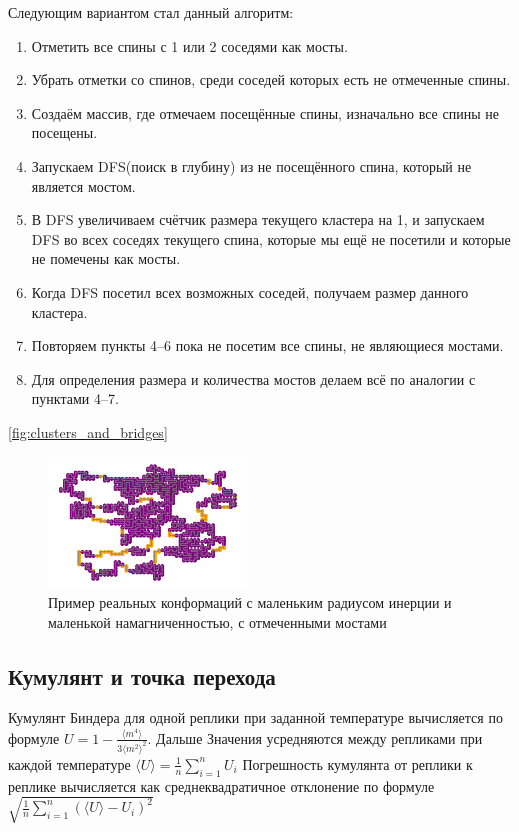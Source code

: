 Следующим вариантом стал данный алгоритм:

\begin{enumerate}
	\item Отметить все спины с 1 или 2 соседями как мосты.
	\item Убрать отметки со спинов, среди соседей которых есть не отмеченные спины.
	\item Создаём массив, где отмечаем посещённые спины, изначально все спины не посещены.
	\item Запускаем DFS(поиск в глубину) из не посещённого спина, который не является мостом.
	\item В DFS увеличиваем счётчик размера текущего кластера на 1, и запускаем DFS во всех соседях текущего спина, которые мы ещё не посетили и которые не помечены как мосты.
	\item Когда DFS посетил всех возможных соседей, получаем размер данного кластера.
	\item Повторяем пункты 4--6 пока не посетим все спины, не являющиеся мостами.
	\item Для определения размера и количества мостов делаем всё по аналогии с пунктами 4--7.
\end{enumerate}

\ref{fig:clusters_and_bridges}

\begin{figure}[h]
	\centering
	\includegraphics[width=0.47\textwidth]{../images/bridges_example_1.png}  
	\caption{Пример реальных конформаций с маленьким радиусом инерции и маленькой намагниченностью, с отмеченными мостами}
	\label{fig:claters_and_bridges}
\end{figure}




\subsection{Кумулянт и точка перехода}

Кумулянт Биндера для одной реплики при заданной температуре вычисляется по формуле $U = 1 - \frac{\langle m^4\rangle}{3\langle m^2\rangle ^2}$. Дальше Значения усредняются между репликами при каждой температуре $\langle U\rangle = \frac{1}{n}\sum_{i=1}^{n}U_i$ 
Погрешность кумулянта от реплики к реплике вычисляется как среднеквадратичное отклонение по формуле $\sqrt{\frac{1}{n}\sum_{i=1}^{n}(\langle U\rangle - U_i)^2}$


